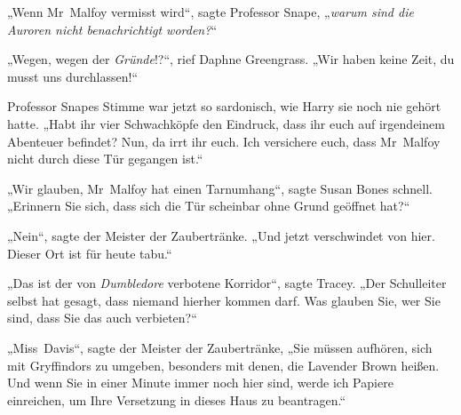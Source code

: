 „Wenn Mr~Malfoy vermisst wird“, sagte Professor Snape, „\emph{warum sind die Auroren nicht benachrichtigt worden?}“

„Wegen, wegen der \emph{Gründe}!?“, rief Daphne Greengrass. „Wir haben keine Zeit, du musst uns durchlassen!“

Professor Snapes Stimme war jetzt so sardonisch, wie Harry sie noch nie gehört hatte.
„Habt ihr vier Schwachköpfe den Eindruck, dass ihr euch auf irgendeinem Abenteuer befindet? Nun, da irrt ihr euch. Ich versichere euch, dass Mr~Malfoy nicht durch diese Tür gegangen ist.“

„Wir glauben, Mr~Malfoy hat einen Tarnumhang“, sagte Susan Bones schnell. „Erinnern Sie sich, dass sich die Tür scheinbar ohne Grund geöffnet hat?“

„Nein“, sagte der Meister der Zaubertränke. „Und jetzt verschwindet von hier. Dieser Ort ist für heute tabu.“

„Das ist der von \emph{Dumbledore} verbotene Korridor“, sagte Tracey. „Der Schulleiter selbst hat gesagt, dass niemand hierher kommen darf. Was glauben Sie, wer Sie sind, dass Sie das auch verbieten?“

„Miss~Davis“, sagte der Meister der Zaubertränke, „Sie müssen aufhören, sich mit Gryffindors zu umgeben, besonders mit denen, die Lavender Brown heißen. Und wenn Sie in einer Minute immer noch hier sind, werde ich Papiere einreichen, um Ihre Versetzung in dieses Haus zu beantragen.“

